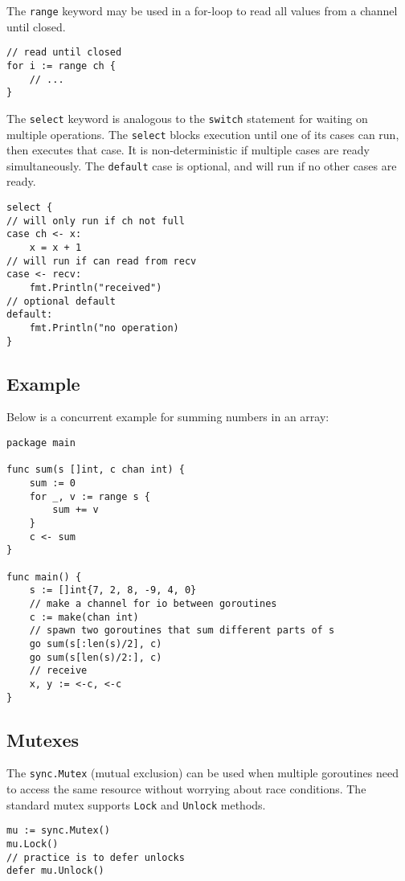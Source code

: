 \documentclass{article}
\begin{document}
\begin{paracol}{2}
\noindent The \lstinline|range| keyword may be used in a for-loop to read all values from a channel until closed.

\switchcolumn
\begin{lstlisting}
// read until closed
for i := range ch {
    // ...
}
\end{lstlisting}
\switchcolumn*

\noindent The \lstinline|select| keyword is analogous to the \lstinline|switch| statement for waiting on multiple operations. The \lstinline|select| blocks execution until one of its cases can run, then executes that case. It is non-deterministic if multiple cases are ready simultaneously. The \lstinline|default| case is optional, and will run if no other cases are ready.

\switchcolumn

\begin{lstlisting}
select {
// will only run if ch not full
case ch <- x:
    x = x + 1
// will run if can read from recv
case <- recv:
    fmt.Println("received")
// optional default
default:
    fmt.Println("no operation)
}
\end{lstlisting}

\end{paracol}

\subsection{Example}

Below is a concurrent example for summing numbers in an array:\\

\begin{lstlisting}
package main

func sum(s []int, c chan int) {
    sum := 0
    for _, v := range s {
        sum += v
    }
    c <- sum
}

func main() {
    s := []int{7, 2, 8, -9, 4, 0}
    // make a channel for io between goroutines
    c := make(chan int)
    // spawn two goroutines that sum different parts of s
    go sum(s[:len(s)/2], c)
    go sum(s[len(s)/2:], c)
    // receive
    x, y := <-c, <-c 
}
\end{lstlisting}

\subsection{Mutexes}

\begin{paracol}{2}

The \lstinline|sync.Mutex| (mutual exclusion) can be used when multiple goroutines need to access the same resource without worrying about race conditions. The standard mutex supports \lstinline|Lock| and \lstinline|Unlock| methods.

\switchcolumn

\begin{lstlisting}
mu := sync.Mutex()
mu.Lock() 
// practice is to defer unlocks
defer mu.Unlock()
\end{lstlisting}

\end{paracol}
\end{document}
